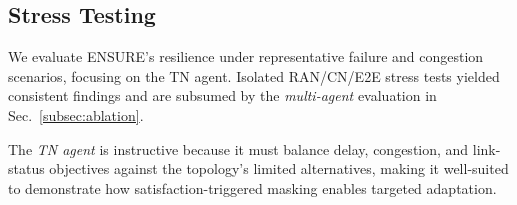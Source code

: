 \documentclass[12pt,lettersize,journal,onecolumn]{IEEEtran}
\begin{document}
\subsection{Stress Testing} \label{subsec:stress}
We evaluate ENSURE's resilience under representative failure and congestion scenarios, focusing on the TN agent. Isolated RAN/CN/E2E stress tests yielded consistent findings and are subsumed by the \emph{multi-agent} evaluation in Sec.~\ref{subsec:ablation}.

The \emph{TN agent} is instructive because it must balance delay, congestion, and link-status objectives against the topology's limited alternatives, making it well-suited to demonstrate how satisfaction-triggered masking enables targeted adaptation. %
\end{document}
